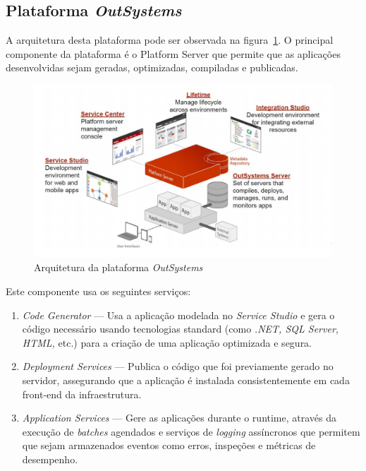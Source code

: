 \subsection{Plataforma \textit{OutSystems}}\label{sec:OutSystemsArch}

A arquitetura desta plataforma pode ser observada na figura~\ref{fig:outsystemsArch}. 
O principal componente da plataforma é o Platform Server que permite que as aplicações 
desenvolvidas sejam geradas, optimizadas, compiladas e publicadas. 

\begin{figure}[H]
  \centering
  \includegraphics[]{figures/Architecture.png}
  \caption{Arquitetura da plataforma \textit{OutSystems~\cite{outsystems}}}\label{fig:outsystemsArch}
\end{figure}

Este componente usa os seguintes serviços: 
\begin{enumerate}
  \item \textit{Code Generator} --- Usa a aplicação modelada no \textit{Service Studio} e gera o código necessário usando tecnologias standard (como \textit{.NET, SQL Server, HTML,} etc.) para a criação de uma aplicação optimizada e segura.
  \item \textit{Deployment Services} --- Publica o código que foi previamente gerado no servidor, assegurando que a aplicação é instalada consistentemente em cada front-end da infraestrutura.
  \item \textit{Application Services} --- Gere as aplicações durante o runtime, através da execução de \textit{batches} agendados e serviços de \textit{logging} assíncronos que permitem que sejam armazenados eventos como erros, inspeções e métricas de desempenho.
\end{enumerate}

